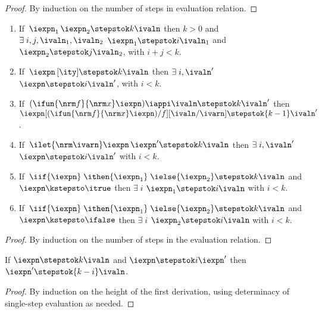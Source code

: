 \begin{proof}
  By induction on the number of steps in evaluation relation.
\end{proof}

\begin{lemma}
  \begin{enumerate}
  \item If $\, \iexpn_1 \, \iexpn_2 \stepstok k \ivaln$ then $k > 0$ and
    $\exists\;i,j,\ivaln_1,\ivaln_2$ \suchthat{} $\iexpn_1 \stepstok i \ivaln_1$ and $\iexpn_2 \stepstok j
      \ivaln_2$, with $i+j < k$.
  \item If $\, \iexpn\,[\ity] \stepstok k \ivaln$ then
    $\exists\;i,\ivaln'$ \suchthat{} $\iexpn \stepstok i
    \ivaln'$, with $i < k$.
  \item If $\, (\ifun {\nrm f} {\nrm x} \iexpn) \iappi \ivaln \stepstok k \ivaln'$ then
    $\iexpn[(\ifun {\nrm f} {\nrm x} \iexpn)/f][\ivaln/\ivarn] \stepstok {k-1} \ivaln'$.
  \item If $\, \ilet {\nrm \ivarn} \iexpn \, \iexpn' \stepstok k
    \ivaln$ then $\exists\;i,\ivaln'$ \suchthat{} $\iexpn
    \stepstok i \ivaln'$ with $i < k$. 
  \item If $\, \iif{\iexpn}\;\ithen {\iexpn_1}\; \ielse{\iexpn_2} \stepstok
    k \ivaln$ and $\iexpn \kstepsto \itrue$ then $\exists\;i$ \suchthat{} $\iexpn_1 \stepstok i
    \ivaln$ with $i < k$.
  \item If $\, \iif{\iexpn}\;\ithen {\iexpn_1}\; \ielse{\iexpn_2} \stepstok
    k \ivaln$ and $\iexpn \kstepsto \ifalse$ then $\exists\;i$ \suchthat{} $\iexpn_2 \stepstok i
    \ivaln$ with $i < k$.
  \end{enumerate}
\label{lemma:kleene-eval-inv}
\end{lemma}

\begin{proof}
  By induction on the number of steps in the evaluation relation.
\end{proof}

\begin{lemma}
  If $\iexpn \stepstok k \ivaln$ and $\iexpn \stepstok i \iexpn'$ then
  $\iexpn' \stepstok {k-i} \ivaln$.
  \label{lemma:eval-unique}
\end{lemma}

\begin{proof}
  By induction on the height of the first derivation, using
  determinacy of single-step evaluation as needed.
\end{proof}

